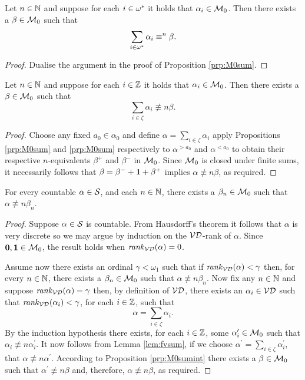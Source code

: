 \begin{prp}\label{prp:M0sumop}
	Let $n\in\mathbb{N}$ and suppose for each $i\in{\omega}^\ast$ it holds that
	$\alpha_i\in\mathcal{M}_0$.  Then there exists a $\beta\in\mathcal{M}_0$ such that
	\begin{equation}
		\sum_{i\in{\omega}^\ast}\alpha_i\equiv^{n}\beta.
	\end{equation}
\end{prp}
\begin{proof}
	Dualise the argument in the proof of Proposition \ref{prp:M0sum}.
\end{proof}

\begin{prp}\label{prp:M0sumint}
	Let $n\in\mathbb{N}$ and suppose for each $i\in\mathbb{Z}$ it holds that
	$\alpha_i\in\mathcal{M}_0$.  Then there exists a $\beta\in\mathcal{M}_0$ such that
	\begin{equation}
		\sum_{i\in\zeta}\alpha_i\nequiv{n}\beta.
	\end{equation}
\end{prp}
\begin{proof}
	Choose any fixed $a_0\in\alpha_0$ and define
	$\alpha=\sum_{i\in\zeta}\alpha_i$ apply Propositions \ref{prp:M0sum} and
	\ref{prp:M0sum} respectively to $\alpha^{>a_0}$ and $\alpha^{<a_0}$ to
	obtain their respective $n$-equivalents $\beta^+$ and $\beta^-$ in $\mathcal{M}_0$.
	Since $\mathcal{M}_0$ is closed under finite sums, it necessarily follows that
	$\beta=\beta^-+\mathbf{1}+\beta^+$ implies $\alpha\nequiv{n}\beta$, as required.
\end{proof}

\begin{thm}
	For every countable $\alpha\in\mathcal{S}$, and each $n\in\mathbb{N}$, there
	exists a $\beta_n\in\mathcal{M}_0$ such that $\alpha\nequiv{n}\beta_n$.
\end{thm}
\begin{proof}
	Suppose $\alpha\in\mathcal{S}$ is countable.  From Hausdorff's theorem it follows that $\alpha$ is very discrete so we may argue by induction on the $\mathcal{VD}$-rank of $\alpha$. Since $\mathbf{0},\mathbf{1}\in\mathcal{M}_0$, the result holds when $\mathit{rank}_\mathcal{VD}(\alpha)=0$.

	Assume now there exists an ordinal $\gamma<\omega_1$ such that if $\mathit{rank}_\mathcal{VD}(\alpha)<\gamma$ then, for every $n\in\mathbb{N}$, there exists a $\beta_n\in\mathcal{M}_0$ such that $\alpha\nequiv{n}\beta_n$.  Now fix any $n\in\mathbb{N}$ and  suppose $\mathit{rank}_\mathcal{VD}(\alpha)=\gamma$ then, by definition of $\mathcal{VD}$, there exists an $\alpha_i\in\mathcal{VD}$ such that $\mathit{rank}_\mathcal{VD}(\alpha_i)<\gamma$, for each $i\in\mathbb{Z}$, such that
	\begin{equation}
		\alpha=\sum_{i\in\zeta}\alpha_i.
	\end{equation}
	By the induction hypothesis there exists, for each $i\in\mathbb{Z}$, some $\alpha^\prime_i\in\mathcal{M}_0$ such that $\alpha_i\nequiv{n}\alpha_i^\prime$.  It now follows from Lemma \ref{lem:fvsum}, if we choose $\alpha^\prime=\sum_{i\in\zeta}\alpha_i^\prime$, that $\alpha\nequiv{n}\alpha^\prime$.  According to Proposition \ref{prp:M0sumint} there exists a $\beta\in\mathcal{M}_0$ such that $\alpha^\prime\nequiv{n}\beta$ and, therefore, $\alpha\nequiv{n}\beta$, as required.
\end{proof}

